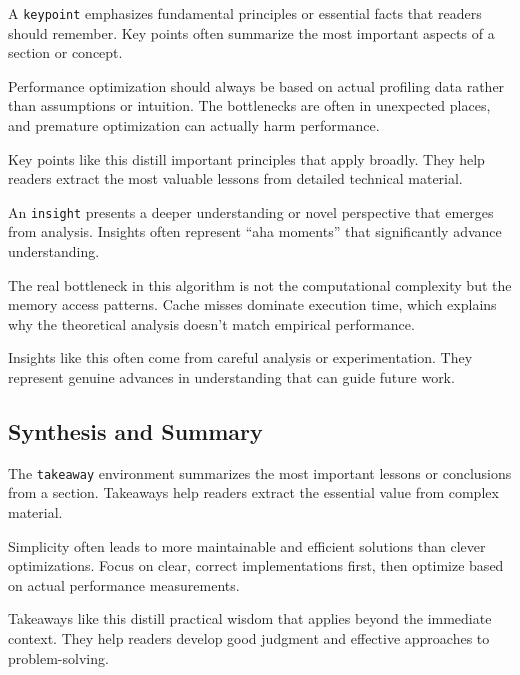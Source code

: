 \documentclass[9pt]{amsart}
\begin{document}
A \texttt{keypoint} emphasizes fundamental principles or essential facts that
readers should remember. Key points often summarize the most important aspects
of a section or concept.

\begin{keypoint}
	Performance optimization should always be based on actual profiling data rather than assumptions or intuition. The bottlenecks are often in unexpected places, and premature optimization can actually harm performance.
\end{keypoint}

Key points like this distill important principles that apply broadly. They help
readers extract the most valuable lessons from detailed technical material.

An \texttt{insight} presents a deeper understanding or novel perspective that
emerges from analysis. Insights often represent ``aha moments'' that
significantly advance understanding.

\begin{insight}
	The real bottleneck in this algorithm is not the computational complexity but the memory access patterns. Cache misses dominate execution time, which explains why the theoretical analysis doesn't match empirical performance.
\end{insight}

Insights like this often come from careful analysis or experimentation. They
represent genuine advances in understanding that can guide future work.

\subsection{Synthesis and Summary}

The \texttt{takeaway} environment summarizes the most important lessons or
conclusions from a section. Takeaways help readers extract the essential value
from complex material.

\begin{takeaway}
	Simplicity often leads to more maintainable and efficient solutions than clever optimizations. Focus on clear, correct implementations first, then optimize based on actual performance measurements.
\end{takeaway}

Takeaways like this distill practical wisdom that applies beyond the immediate
context. They help readers develop good judgment and effective approaches to
problem-solving.
\end{document}
